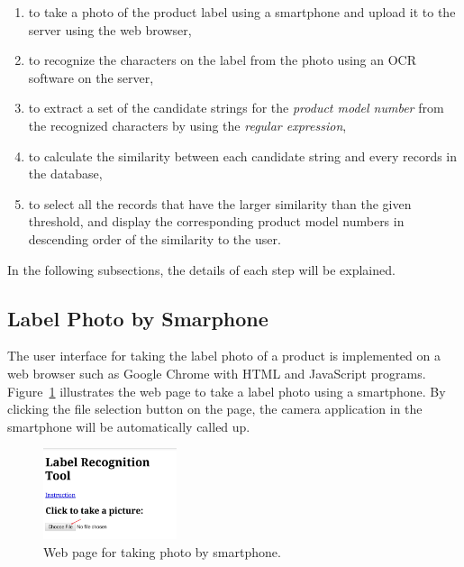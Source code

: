 \documentclass[technicalreport]{ieicej}
\begin{document}
        \begin{enumerate}
            \item to take a photo of the product label using a smartphone and upload it to the server using the web browser,
            \item to recognize the characters on the label from the photo using an OCR software on the server,
            \item to extract a set of the candidate strings for the {\em product model number} from the recognized characters by using the {\em regular expression}, 
            \item to calculate the similarity between each candidate string and every records in the database,
            \item to select all the records that have the larger similarity than the given threshold, and display the corresponding product model numbers in descending order of the similarity to the user. 
        \end{enumerate}

        In the following subsections, the details of each step will be explained.

    \subsection{Label Photo by Smarphone}
    \label{sec:label-requirement}
        The user interface for taking the label photo of a product is implemented on a web browser such as Google Chrome with HTML and JavaScript programs. Figure~\ref{fig:homepage} illustrates the web page to take a label photo using a smartphone. By clicking the file selection button on the page, the camera application in the smartphone will be automatically called up.

        \begin{figure}[t] 
            \begin{center}
            \includegraphics[width=0.35\textwidth]{figure/homepage.png}
            \end{center}
            \caption{Web page for taking photo by smartphone.}
            \label{fig:homepage}
        \end{figure}
\end{document}
